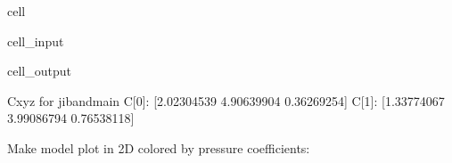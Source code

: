 \documentclass[letterpaper,10pt,english]{jupyterBook}
\begin{document}
\begin{sphinxuseclass}{cell}\begin{sphinxVerbatimInput}

\begin{sphinxuseclass}{cell_input}
\begin{sphinxVerbatim}[commandchars=\\\{\}]
   
    
    \PYG{l+s+s2}{C[}\PYG{l+s+s2}{]: }
\end{sphinxVerbatim}

\end{sphinxuseclass}\end{sphinxVerbatimInput}
\begin{sphinxVerbatimOutput}

\begin{sphinxuseclass}{cell_output}
\begin{sphinxVerbatim}[commandchars=\\\{\}]
Cxyz for jib\PYGZus{}and\PYGZus{}main
C[0]: [\PYGZhy{}2.02304539  4.90639904 \PYGZhy{}0.36269254]
C[1]: [\PYGZhy{}1.33774067  3.99086794 \PYGZhy{}0.76538118]
\end{sphinxVerbatim}

\end{sphinxuseclass}\end{sphinxVerbatimOutput}

\end{sphinxuseclass}
\sphinxAtStartPar
Make model plot in 2D colored by pressure coefficients:
\end{document}
